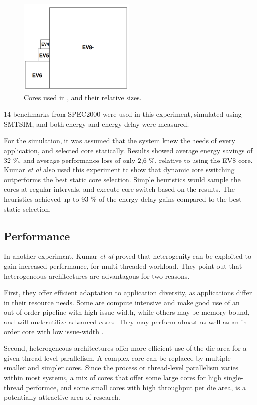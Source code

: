 \begin{figure}[htb]
    \centering
    \includegraphics[width=0.5\textwidth]{Figures/Heterogeneous/Kumar1}
    \caption{Cores used in \cite{heterogeneous-ee}, and their relative sizes.}
    \label{fig:Kumar1}
\end{figure}

14 benchmarks from SPEC2000 were used in this experiment, simulated using SMTSIM, and both energy and energy-delay were measured.

For the simulation, it was assumed that the system knew the needs of every application, and selected core statically. 
Results showed average energy savings of 32 \%, and average performance loss of only 2,6 \%, relative to using the EV8 core.
Kumar \textit{et al} also used this experiment to show that dynamic core switching outperforms the best static core selection.
Simple heuristics would sample the cores at regular intervals, and execute core switch based on the results.
The heuristics achieved up to 93 \% of the energy-delay gains compared to the best static selection. 

\subsection{Performance}
\label{subsec:rw_perf}
In another experiment, Kumar \textit{et al} proved that heterogenity can be exploited to gain increased performance, for multi-threaded workload.
They point out that heterogeneous architectures are advantagous for two reasons.

First, they offer efficient adaptation to application diversity, as applications differ in their resource needs.
Some are compute intensive and make good use of an out-of-order pipeline with high issue-width, while others may be memory-bound, and will underutilize advanced cores.
They may perform almost as well as an in-order core with low issue-width \cite{heterogeneous-perf}.

Second, heterogeneous architectures offer more efficient use of the die area for a given thread-level parallelism.
A complex core can be replaced by multiple smaller and simpler cores. 
Since the process or thread-level parallelism varies within most systems, a mix of cores that offer some large cores for high single-thread performce, and some small cores with high throughput per die area, is a potentially attractive area of research. \cite{heterogeneous-perf}

